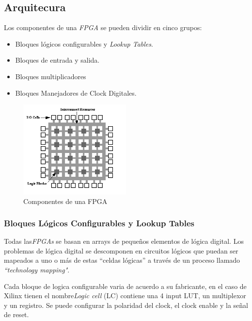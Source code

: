 	\subsection{Arquitecura}
Los componentes de una \textit{FPGA} se pueden dividir en cinco grupos:

\begin {itemize}
\item  Bloques lógicos configurables y \textit{Lookup Tables}.
\item  Bloques de entrada y salida.
\item  Bloques multiplicadores
\item  Bloques Manejadores de Clock Digitales.
 \end {itemize}

\begin{figure}[h!]
 \begin{center}
   \includegraphics[width=0.5\textwidth,keepaspectratio=true]{./images/fpga1a}
  \caption{Componentes de una FPGA}
  \label{fig:esquema}
 \end{center}
\end{figure}

		\subsubsection{Bloques Lógicos Configurables y Lookup Tables}

Todas las\textit{FPGAs} se basan en arrays de pequeños elementos de lógica digital. Los problemas de lógica digital se descomponen en circuitos lógicos que puedan ser mapeados a uno o más de estas “celdas lógicas” a través de un proceso llamado \textit{“technology mapping"}.

Cada bloque de logica configurable varia de acuerdo a su fabricante, en el caso de Xilinx tienen el nombre\textit{Logic cell} (LC) contiene una 4 input LUT, un multiplexor y un registro. Se puede configurar la polaridad del clock, el clock enable y la señal de reset.


